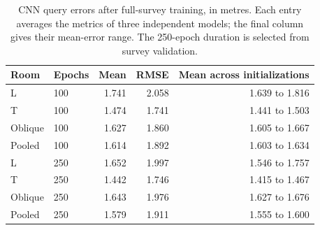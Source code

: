 \begin{table}[H]
\centering
\caption{CNN query errors after full-survey training, in metres. Each entry averages the metrics of three independent models; the final column gives their mean-error range. The 250-epoch duration is selected from survey validation.}
\label{tab:cnn}
\setlength{\tabcolsep}{4pt}
\begin{tabular}{llrrr}
\toprule
Room & Epochs & Mean & RMSE & Mean across initializations\\
\midrule
L & 100 & 1.741 & 2.058 & 1.639 to 1.816\\
T & 100 & 1.474 & 1.741 & 1.441 to 1.503\\
Oblique & 100 & 1.627 & 1.860 & 1.605 to 1.667\\
Pooled & 100 & 1.614 & 1.892 & 1.603 to 1.634\\
L & 250 & 1.652 & 1.997 & 1.546 to 1.757\\
T & 250 & 1.442 & 1.746 & 1.415 to 1.467\\
Oblique & 250 & 1.643 & 1.976 & 1.627 to 1.676\\
Pooled & 250 & 1.579 & 1.911 & 1.555 to 1.600\\
\bottomrule
\end{tabular}
\end{table}
